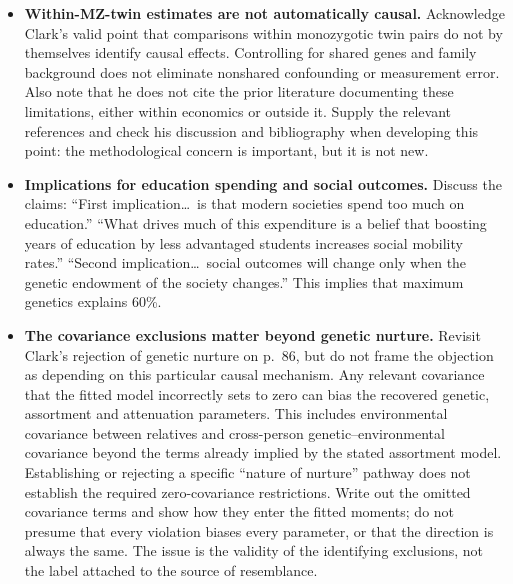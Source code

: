 \begin{itemize}
\item \textbf{Within-MZ-twin estimates are not automatically causal.}
Acknowledge Clark's valid point that comparisons within monozygotic
twin pairs do not by themselves identify causal effects. Controlling
for shared genes and family background does not eliminate nonshared
confounding or measurement error. Also note that he does not cite the
prior literature documenting these limitations, either within economics
or outside it. Supply the relevant references and check his discussion
and bibliography when developing this point: the methodological concern
is important, but it is not new.
\item \textbf{Implications for education spending and social outcomes.}
Discuss the claims: ``First implication\ldots\ is that modern societies
spend too much on education.'' ``What drives much of this expenditure
is a belief that boosting years of education by less advantaged students
increases social mobility rates.'' ``Second implication\ldots\ social
outcomes will change only when the genetic endowment of the society
changes.'' This implies that maximum genetics explains 60\%.
\item \textbf{The covariance exclusions matter beyond genetic nurture.}
Revisit Clark's rejection of genetic nurture on p.~86, but do not frame
the objection as depending on this particular causal mechanism. Any
relevant covariance that the fitted model incorrectly sets to zero can
bias the recovered genetic, assortment and attenuation parameters.
This includes environmental covariance between relatives and
cross-person genetic--environmental covariance beyond the terms already
implied by the stated assortment model. Establishing or rejecting a
specific ``nature of nurture'' pathway does not establish the required
zero-covariance restrictions. Write out the omitted covariance terms and
show how they enter the fitted moments; do not presume that every
violation biases every parameter, or that the direction is always the
same. The issue is the validity of the identifying exclusions, not the
label attached to the source of resemblance.


\end{itemize}
